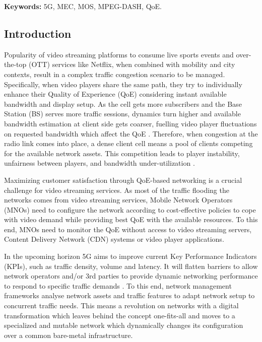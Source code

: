 \textbf{Keywords:} 5G, MEC, MOS, MPEG-DASH, QoE.

\subsection{Introduction}
\label{intro}

Popularity of video streaming platforms to consume live sports events and over-the-top (OTT) services like Netflix, when combined with mobility and city contexts, result in a complex traffic congestion scenario to be managed. Specifically, when video players share the same path, they try to individually enhance their Quality of Experience (QoE) considering instant available bandwidth and display setup. As the cell gets more subscribers and the Base Station (BS) serves more traffic sessions, dynamics turn higher and available bandwidth estimation at client side gets coarser, fuelling video player fluctuations on requested bandwidth which affect the QoE \cite{khan2018}. Therefore, when congestion at the radio link comes into place, a dense client cell means a pool of clients competing for the available network assets. This competition leads to player instability, unfairness between players, and bandwidth under-utilization \cite{akhshabi2012}.

Maximizing customer satisfaction through QoE-based networking is a crucial challenge for video streaming services.
As most of the traffic flooding the networks comes from video streaming services, Mobile Network Operators (MNOs) need to configure the network according to cost-effective policies to cope with video demand while providing best QoE with the available resources.
To this end, MNOs need to monitor the QoE without access to video streaming servers, Content Delivery Network (CDN) systems or video player applications.

In the upcoming horizon 5G aims to improve current Key Performance Indicators (KPIs), such as traffic density, volume and latency. It will flatten barriers to allow network operators and/or 3rd parties to provide dynamic networking performance to respond to specific traffic demands \cite{etsits5g}.
To this end, network management frameworks analyse network assets and traffic features to adapt network setup to concurrent traffic needs. This means a revolution on networks with a digital transformation which leaves behind the concept one-fits-all and moves to a specialized and mutable network which dynamically changes its configuration over a common bare-metal infrastructure.

